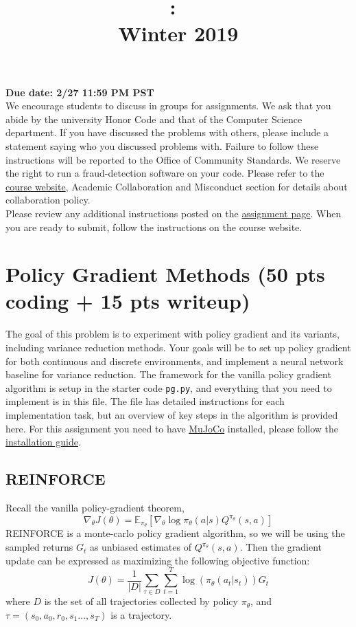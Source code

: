 \documentclass{article}
\title{
\vspace{-1in}
\textmd{\textbf{\hmwkClass:\ \hmwkTitle\\
Winter 2019}}}
\date{} %
\begin{document}
\maketitle
\vspace{-.5in}
\begin{framed}
\textbf{Due date: 2/27 11:59 PM PST}
\\[1em]
 We encourage students to discuss in groups for assignments. We ask
 that you abide by the university Honor Code and that of the Computer Science    department. If you have discussed the problems with others,
 please include a statement saying who you discussed problems with. Failure to   follow these instructions
 will be reported to the Office of Community Standards. We reserve the right to  run a fraud-detection software on your code. Please refer to the \href{http://web.  stanford.edu/class/cs234/index.html}{course website}, Academic Collaboration and Misconduct section for details about collaboration policy.
\\[1em]
Please review any additional instructions posted on the \href{http://cs234.stanford.edu/assignment3/index.html}{assignment page}. When you are ready to submit,
follow the instructions on the course website.
\end{framed}


\section{Policy Gradient Methods (50 pts coding + 15 pts writeup)}
The goal of this problem is to experiment with policy gradient and its variants, including variance reduction methods. Your goals will be to set up policy gradient for both continuous and discrete environments, and implement a neural network baseline for variance reduction. The framework for the vanilla policy gradient algorithm is setup in the starter code \texttt{pg.py}, and everything that you need to implement is in this file. The file has detailed instructions for each implementation task, but an overview of key steps in the algorithm is provided here. For this assignment you need to have \href{http://www.mujoco.org/index.html}{MuJoCo} installed, please follow the \href{https://drive.google.com/file/d/1PriAh0D3QSp2-5jLed-UohX9qH8j51zj/view}{installation guide}.

\subsection*{REINFORCE}
Recall the vanilla policy-gradient theorem,
\[ \nabla_\theta J(\theta) = \mathbb E_{\pi_\theta} \left[ \nabla_\theta \log\pi_\theta(a|s) Q^{\pi_\theta} (s,a) \right] \]
REINFORCE is a monte-carlo policy gradient algorithm, so we will be using the sampled returns $G_t$ as unbiased estimates of $Q^{\pi_\theta}(s,a)$. 
Then the gradient update can be expressed as maximizing the following objective function:
\[ J(\theta) = \frac{1}{|D|} \sum_{\tau \in D} \sum_{t=1}^T \log(\pi_\theta(a_t|s_t)) G_t \]
where $D$ is the set of all trajectories collected by policy $\pi_\theta$, and $\tau=(s_0, a_0, r_0,s_1...,s_T)$ is a trajectory.
\end{document}
